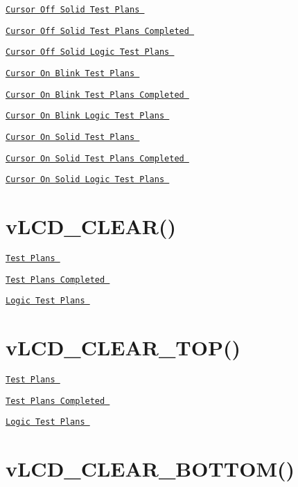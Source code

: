 \par
 \href{vLCD_ON_OFF_CURSOR_OFF_SOLID_TESTPLAN.pdf}{\tt Cursor Off Solid Test Plans } \par
 \href{vLCD_ON_OFF_CURSOR_OFF_SOLID_TESTPLAN_COMPLETE.pdf}{\tt Cursor Off Solid Test Plans Completed } \par
 \href{vLCD_ON_OFF_CURSOR_OFF_SOLID_LOGIC.pdf}{\tt Cursor Off Solid Logic Test Plans } \par
\par
 \href{vLCD_ON_OFF_CURSOR_ON_BLINK_TESTPLAN.pdf}{\tt Cursor On Blink Test Plans } \par
 \href{vLCD_ON_OFF_CURSOR_ON_BLINK_TESTPLAN_COMPLETE.pdf}{\tt Cursor On Blink Test Plans Completed } \par
 \href{vLCD_ON_OFF_CURSOR_ON_BLINK_LOGIC.pdf}{\tt Cursor On Blink Logic Test Plans } \par
\par
 \href{vLCD_ON_OFF_CURSOR_ON_SOLID_TESTPLAN.pdf}{\tt Cursor On Solid Test Plans } \par
 \href{vLCD_ON_OFF_CURSOR_ON_SOLID_TESTPLAN_COMPLETE.pdf}{\tt Cursor On Solid Test Plans Completed } \par
 \href{vLCD_ON_OFF_CURSOR_ON_SOLID_LOGIC.pdf}{\tt Cursor On Solid Logic Test Plans }\hypertarget{_test_plans_clear}{}\section{v\-L\-C\-D\-\_\-\-C\-L\-E\-A\-R()}\label{_test_plans_clear}
\href{vLCD_CLEAR_TESTPLAN.pdf}{\tt Test Plans } \par
 \href{vLCD_CLEAR_TESTPLAN_CREATE.pdf}{\tt Test Plans Completed } \par
 \href{vLCD_CLEAR_LOGIC.pdf}{\tt Logic Test Plans }\hypertarget{_test_plans_clear_top}{}\section{v\-L\-C\-D\-\_\-\-C\-L\-E\-A\-R\-\_\-\-T\-O\-P()}\label{_test_plans_clear_top}
\href{vLCD_CLEAR_TOP_TESTPLAN.pdf}{\tt Test Plans } \par
 \href{vLCD_CLEAR_TOP_TESTPLAN_COMPLETE.pdf}{\tt Test Plans Completed } \par
 \href{vLCD_CLEAR_TOP_LOGIC.pdf}{\tt Logic Test Plans }\hypertarget{_test_plans_clear_bottom}{}\section{v\-L\-C\-D\-\_\-\-C\-L\-E\-A\-R\-\_\-\-B\-O\-T\-T\-O\-M()}\label{_test_plans_clear_bottom}
